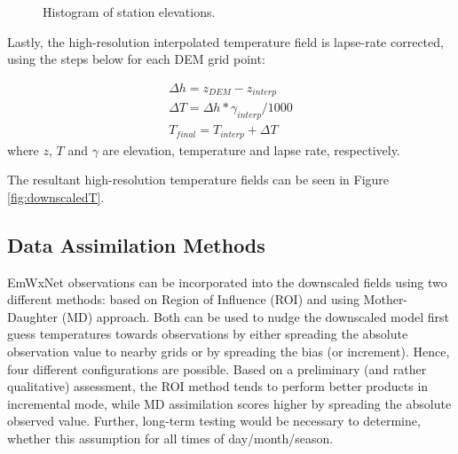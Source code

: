 \documentclass{article}
\begin{document}
\begin{figure}
\caption{Histogram of station elevations.}\label{fig:histogram} 
\end{figure}

Lastly, the high-resolution interpolated temperature field is lapse-rate corrected, using the steps below for each DEM grid point:

\begin{eqnarray}
\Delta h = z_{DEM} - z_{interp} \nonumber \\
\Delta T = \Delta h * \gamma_{interp}/1000  \nonumber\\
T_{final} = T_{interp} + \Delta T
\end{eqnarray}
where $z$, $T$ and $\gamma$ are elevation, temperature and lapse rate, respectively. 

The resultant high-resolution temperature fields can be seen in Figure \ref{fig:downscaledT}. 
\FloatBarrier

\subsection{Data Assimilation Methods}
EmWxNet observations can be incorporated into the downscaled fields using two different methods: based on Region of Influence (ROI) and using Mother-Daughter (MD) approach. Both can be used to nudge the downscaled model first guess temperatures towards observations by either spreading the absolute observation value to nearby grids or by spreading the bias (or increment). Hence, four different configurations are possible. Based on a preliminary (and rather qualitative) assessment, the ROI method tends to perform better products in incremental mode, while MD assimilation scores higher by spreading the absolute observed value. Further, long-term testing would be necessary to determine, whether this assumption for all times of day/month/season. 
\end{document}
